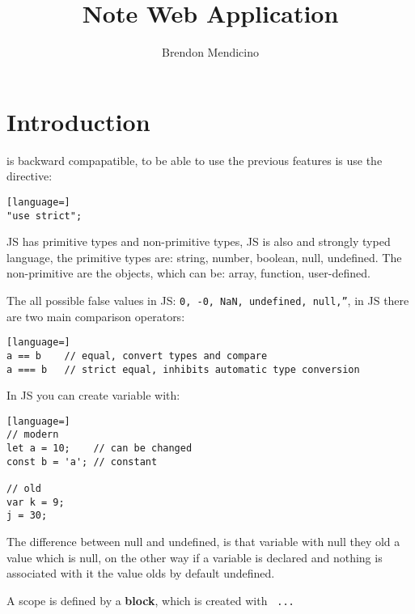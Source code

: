 \documentclass[12pt]{article}
\title{Note Web Application}
\author{Brendon Mendicino}
\begin{document}
\maketitle
\newpage
\tableofcontents
\newpage



\section{ Introduction}
 is backward compapatible, to be able to use the previous features is use the directive:
\begin{lstlisting}[language=]
"use strict";
\end{lstlisting}
JS has primitive types and non-primitive types, JS is also and strongly typed language, the primitive types are: string, number, boolean, null, undefined. The non-primitive are the objects, which can be: array, function, user-defined.

The all possible false values in JS: \texttt{0, -0, NaN, undefined, null,''}, in JS there are two main comparison operators:
\begin{lstlisting}[language=]
a == b    // equal, convert types and compare
a === b   // strict equal, inhibits automatic type conversion
\end{lstlisting}
In JS you can create variable with:
\begin{lstlisting}[language=]
// modern
let a = 10;    // can be changed
const b = 'a'; // constant

// old
var k = 9;
j = 30;
\end{lstlisting}
The difference between null and undefined, is that variable with null they old a value which is null, on the other way if a variable is declared and nothing is associated with it the value olds by default undefined.

A scope is defined by a \textbf{block}, which is created with \texttt{{ ... }}
\end{document}
